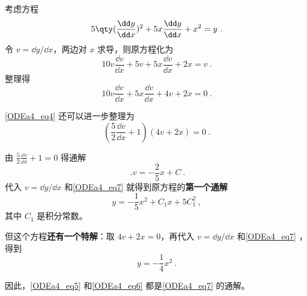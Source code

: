 \begin{example}{}\label{ODEa4_ex1}
考虑方程
\begin{equation}\label{ODEa4_eq7}
5\qty(\frac{\dd y}{\dd x})^2+5x\frac{\dd y}{\dd x}+x^2=y~.
\end{equation}
令 $v=\dd y/\dd x$，两边对 $x$ 求导，则原方程化为
\begin{equation}\label{ODEa4_eq8}
10v\frac{\dd v}{\dd x}+5v+5x\frac{\dd v}{\dd x}+2x=v~.
\end{equation}
整理得
\begin{equation}\label{ODEa4_eq4}
10v\frac{\dd v}{\dd x}+5x\frac{\dd v}{\dd x}+4v+2x=0~.
\end{equation}

\autoref{ODEa4_eq4} 还可以进一步整理为
\begin{equation}
(\frac{5}{2}\frac{\dd v}{\dd x}+1)(4v+2x)=0~.
\end{equation}

由 $\frac{5}{2}\frac{\dd v}{\dd x}+1=0$ 得通解
\begin{equation}\label{ODEa4_eq9}~.
v=-\frac{2}{5}x+C~.
\end{equation}
代入 $v=\dd y/\dd x$ 和\autoref{ODEa4_eq7} 就得到原方程的\textbf{第一个通解}
\begin{equation}\label{ODEa4_eq5}
y=-\frac{1}{5}x^2+C_1x+5C_1^2~,
\end{equation}
其中 $C_1$ 是积分常数。

但这个方程\textbf{还有一个特解}：取 $4v+2x=0$，再代入 $v=\dd y/\dd x$ 和\autoref{ODEa4_eq7} ，得到
\begin{equation}\label{ODEa4_eq6}
y=-\frac{1}{4}x^2~.
\end{equation}

因此，\autoref{ODEa4_eq5} 和\autoref{ODEa4_eq6} 都是\autoref{ODEa4_eq7} 的通解。




\end{example}

